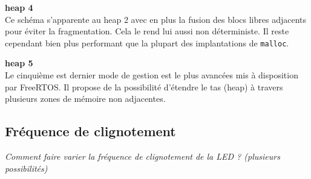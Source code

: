 \noindent
\textbf{heap 4} \\
Ce schéma s'apparente au heap 2 avec en plus la fusion des blocs libres adjacents pour éviter la fragmentation.
Cela le rend lui aussi non déterministe.
Il reste cependant bien plus performant que la plupart des implantations de \texttt{malloc}.

\noindent
\textbf{heap 5} \\
Le cinquième est dernier mode de gestion est le plus avancées mis à disposition par FreeRTOS.
Il propose de la possibilité d'étendre le tas (heap) à travers plusieurs zones de mémoire non adjacentes.


\subsection{Fréquence de clignotement}

\textit{Comment faire varier la fréquence de clignotement de la LED ? (plusieurs possibilités)}
